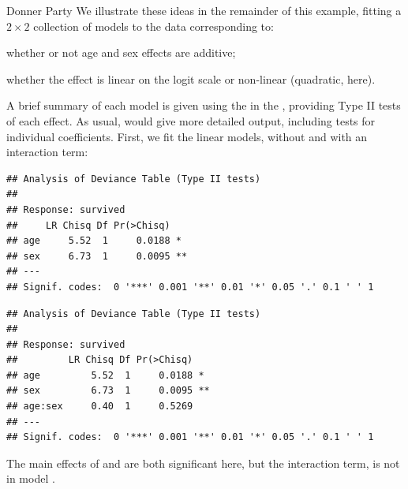 \documentclass[11pt]{book}
\renewenvironment{knitrout}{\small\renewcommand{\baselinestretch}{.85}}{} %
\begin{document}
\begin{Example}[donner1]{Donner Party}
We illustrate these ideas in the remainder of this example, fitting a
$2 \times 2$ collection of models to the  data
corresponding to:
\begin{seriate}
 \item whether or not age and sex effects are additive;
 \item whether the effect is linear on the logit scale or non-linear (quadratic, here).
\end{seriate}
A brief summary of each model is given using the  in
the , providing Type II tests of each effect.
As usual,  would give more detailed output, including
tests for individual coefficients.
First, we fit the linear models, without and with an interaction term:
\begin{knitrout}
\color{fgcolor}\begin{kframe}
\begin{alltt}
 \hlkwb{<-}  \hlopt{~}  \hlopt{+} 
                    
\end{alltt}
\begin{verbatim}
## Analysis of Deviance Table (Type II tests)
## 
## Response: survived
##     LR Chisq Df Pr(>Chisq)   
## age     5.52  1     0.0188 * 
## sex     6.73  1     0.0095 **
## ---
## Signif. codes:  0 '***' 0.001 '**' 0.01 '*' 0.05 '.' 0.1 ' ' 1
\end{verbatim}
\begin{alltt}
 \hlkwb{<-}  \hlopt{~}  \hlopt{*} 
                    
\end{alltt}
\begin{verbatim}
## Analysis of Deviance Table (Type II tests)
## 
## Response: survived
##         LR Chisq Df Pr(>Chisq)   
## age         5.52  1     0.0188 * 
## sex         6.73  1     0.0095 **
## age:sex     0.40  1     0.5269   
## ---
## Signif. codes:  0 '***' 0.001 '**' 0.01 '*' 0.05 '.' 0.1 ' ' 1
\end{verbatim}
\end{kframe}
\end{knitrout}
\noindent The main effects of  and  are both significant here,
but the interaction term,  is not in model .



\end{Example}
\end{document}
